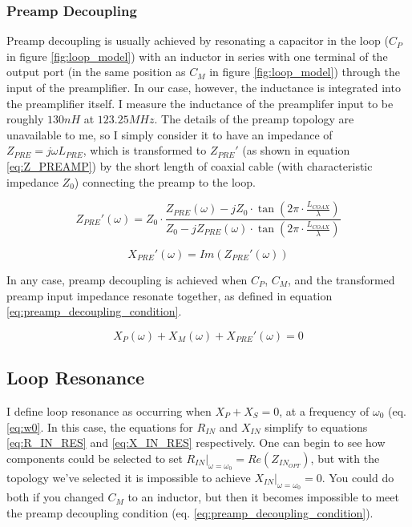\subsubsection{Preamp Decoupling}
Preamp decoupling is usually achieved by resonating a capacitor in the loop ($C_P$ in figure \ref{fig:loop_model}) with
an inductor in series with one terminal of the output port (in the same position as $C_M$ in figure
\ref{fig:loop_model}) through the input of the preamplifier. In our case, however, the inductance is integrated into the
preamplifier itself. I measure the inductance of the preamplifer input to be roughly $130nH$ at $123.25 MHz$. The
details of the preamp topology are unavailable to me, so I simply consider it to have an impedance of $Z_{PRE}=j\omega
L_{PRE}$, which is transformed to ${Z_{PRE}}'$ (as shown in equation \ref{eq:Z_PREAMP}) by the short length of coaxial
cable (with characteristic impedance $Z_0$) connecting the preamp to the loop.

\begin{equation} \label{eq:Z_PREAMP}
    {Z_{PRE}}'(\omega)=Z_0 \cdot \frac{Z_{PRE}(\omega)-j Z_0 \cdot \tan(2\pi\cdot\frac{L_{COAX}}{\lambda})}{Z_0 - j
    Z_{PRE}(\omega) \cdot \tan(2\pi\cdot\frac{L_{COAX}}{\lambda})}
\end{equation}

\begin{equation} \label{eq:X_PREAMP}
    {X_{PRE}}'(\omega)=Im({Z_{PRE}}'(\omega))
\end{equation}
    
In any case, preamp decoupling is achieved when $C_P$, $C_M$, and the transformed preamp input impedance resonate
together, as defined in equation \ref{eq:preamp_decoupling_condition}.

\begin{equation} \label{eq:preamp_decoupling_condition}
    X_P(\omega) + X_M(\omega) +{X_{PRE}}'(\omega) = 0
\end{equation}

\subsection{Loop Resonance}
I define loop resonance as occurring when $X_P + X_S = 0$, at a frequency of $\omega_0$ (eq. \ref{eq:w0}. In this case,
the equations for $R_{IN}$ and $X_{IN}$ simplify to equations \ref{eq:R_IN_RES} and \ref{eq:X_IN_RES} respectively. One
can begin to see how components could be selected to set $R_{IN}\big|_{\omega=\omega_0}=Re(Z_{IN_{OPT}})$, but with the
topology we've selected it is impossible to achieve $X_{IN}\big|_{\omega=\omega_0}=0$. You could do both if you changed
$C_M$ to an inductor, but then it becomes impossible to meet the preamp decoupling condition (eq.
\ref{eq:preamp_decoupling_condition}).


